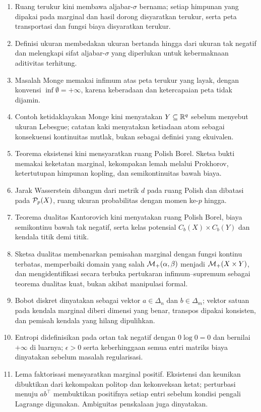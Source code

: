 \documentclass[indonesian]{shinybook}
\begin{document}
\begin{enumerate}
    \item Ruang terukur kini membawa aljabar-$\sigma$ bernama; setiap himpunan yang dipakai pada marginal dan hasil dorong disyaratkan terukur, serta peta transportasi dan fungsi biaya disyaratkan terukur.
    \item Definisi ukuran membedakan ukuran bertanda hingga dari ukuran tak negatif dan melengkapi sifat aljabar-$\sigma$ yang diperlukan untuk kebermaknaan aditivitas terhitung.
    \item Masalah Monge memakai infimum atas peta terukur yang layak, dengan konvensi $\inf\emptyset=+\infty$, karena keberadaan dan ketercapaian peta tidak dijamin.
    \item Contoh ketidaklayakan Monge kini menyatakan $Y\subseteq\mathbb{R}^q$ sebelum menyebut ukuran Lebesgue; catatan kaki menyatakan ketiadaan atom sebagai konsekuensi kontinuitas mutlak, bukan sebagai definisi yang ekuivalen.
    \item Teorema eksistensi kini mensyaratkan ruang Polish Borel. Sketsa bukti memakai keketatan marginal, kekompakan lemah melalui Prokhorov, ketertutupan himpunan kopling, dan semikontinuitas bawah biaya.
    \item Jarak Wasserstein dibangun dari metrik $d$ pada ruang Polish dan dibatasi pada $\mathcal{P}_p(X)$, ruang ukuran probabilitas dengan momen ke-$p$ hingga.
    \item Teorema dualitas Kantorovich kini menyatakan ruang Polish Borel, biaya semikontinu bawah tak negatif, serta kelas potensial $C_b(X)\times C_b(Y)$ dan kendala titik demi titik.
    \item Sketsa dualitas membenarkan pemisahan marginal dengan fungsi kontinu terbatas, memperbaiki domain yang salah $\mathcal{M}_+(\alpha,\beta)$ menjadi $\mathcal{M}_+(X\times Y)$, dan mengidentifikasi secara terbuka pertukaran infimum--supremum sebagai teorema dualitas kuat, bukan akibat manipulasi formal.
    \item Bobot diskret dinyatakan sebagai vektor $a\in\Delta_n$ dan $b\in\Delta_m$; vektor satuan pada kendala marginal diberi dimensi yang benar, transpos dipakai konsisten, dan pemisah kendala yang hilang dipulihkan.
    \item Entropi didefinisikan pada ortan tak negatif dengan $0\log0=0$ dan bernilai $+\infty$ di luarnya; $\epsilon>0$ serta keberhinggaan semua entri matriks biaya dinyatakan sebelum masalah regularisasi.
    \item Lema faktorisasi mensyaratkan marginal positif. Eksistensi dan keunikan dibuktikan dari kekompakan politop dan kekonveksan ketat; perturbasi menuju $ab^\top$ membuktikan positifnya setiap entri sebelum kondisi pengali Lagrange digunakan. Ambiguitas penskalaan juga dinyatakan.

\end{enumerate}
\end{document}
